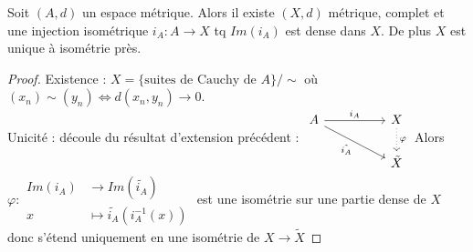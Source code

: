 \begin{propriete} 

Soit $(A,d)$ un espace métrique. Alors il existe $(X,d)$ métrique, complet et une injection isométrique $i_A:A\to X$ tq $Im(i_A)$ est dense dans $X$. De plus $X$ est unique à isométrie près.
\end{propriete}
\begin{proof}
    Existence : $X=\{\text{suites de Cauchy de }A\} /\sim$ où $(x_{n})\sim(y_n)\Leftrightarrow d(x_n,y_n)\to 0$. \\
    Unicité : découle du résultat d'extension précédent :
$\begin{tikzcd}
    A && X\\
        && \tilde{X}
        \arrow["{i_A}", from=1-1, to=1-3]
        \arrow["{\tilde{i_A}}"', from=1-1, to=2-3]
    \arrow["\varphi", dotted, from=1-3, to=2-3]
\end{tikzcd}$
Alors $\varphi :\begin{aligned}Im(i_A)&\longrightarrow Im(\tilde{i_A}) \\ x&\longmapsto \tilde{i_A}(i_A^{-1} (x))\end{aligned}$ est une isométrie sur une partie dense de $X$ donc s'étend uniquement en une isométrie de $X\to \tilde{X}$
\end{proof}

